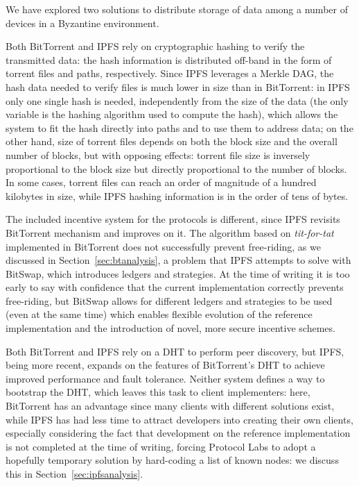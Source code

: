 \documentclass[mscthesis]{usiinfthesis}
\begin{document}
We have explored two solutions to distribute storage of data among a number of devices in a Byzantine environment.

Both BitTorrent and IPFS rely on cryptographic hashing to verify the transmitted data: the hash information is distributed off-band in the form of torrent files and paths, respectively. Since IPFS leverages a Merkle DAG, the hash data needed to verify files is much lower in size than in BitTorrent: in IPFS only one single hash is needed, independently from the size of the data (the only variable is the hashing algorithm used to compute the hash), which allows the system to fit the hash directly into paths and to use them to address data; on the other hand, size of torrent files depends on both the block size and the overall number of blocks, but with opposing effects: torrent file size is inversely proportional to the block size but directly proportional to the number of blocks. In some cases, torrent files can reach an order of magnitude of a hundred kilobytes in size, while IPFS hashing information is in the order of tens of bytes.

The included incentive system for the protocols is different, since IPFS revisits BitTorrent mechanism and improves on it. The algorithm based on \textit{tit-for-tat} implemented in BitTorrent does not successfully prevent free-riding, as we discussed in Section~\ref{sec:btanalysis}, a problem that IPFS attempts to solve with BitSwap, which introduces ledgers and strategies. At the time of writing it is too early to say with confidence that the current implementation correctly prevents free-riding, but BitSwap allows for different ledgers and strategies to be used (even at the same time) which enables flexible evolution of the reference implementation and the introduction of novel, more secure incentive schemes.

Both BitTorrent and IPFS rely on a DHT to perform peer discovery, but IPFS, being more recent, expands on the features of BitTorrent's DHT to achieve improved performance and fault tolerance. Neither system defines a way to bootstrap the DHT, which leaves this task to client implementers: here, BitTorrent has an advantage since many clients with different solutions exist, while IPFS has had less time to attract developers into creating their own clients, especially considering the fact that development on the reference implementation is not completed at the time of writing, forcing Protocol Labs to adopt a hopefully temporary solution by hard-coding a list of known nodes: we discuss this in Section~\ref{sec:ipfsanalysis}.
\end{document}
